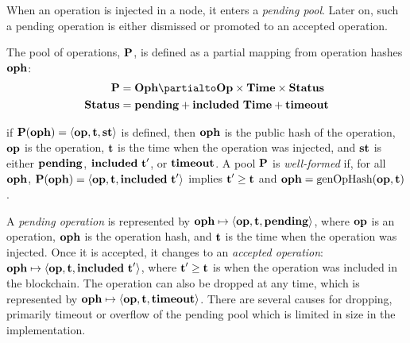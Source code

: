\documentclass[a4paper]{llncs}
\begin{document}
When an operation is injected in a node, it enters a \emph{pending
  pool}. Later on, such a pending operation is either dismissed or
promoted to an accepted operation.

\begin{definition}
  The pool of operations, $\textbf{P}$, is defined as a partial mapping from
  operation hashes $\textbf{oph}$: 
  \begin{align*}
    \PENDING &= \TOPH \partialto \TOP\times \TTIME \times \TSTATUS \\
    \TSTATUS&= \STATUSPENDING + \STATUSINCLUDED\ \TTIME + \STATUSTIMEOUT
  \end{align*}
  
  if $\textbf{P}(\textbf{oph}) = \langle  \textbf{op}, \textbf{t}, \textbf{st}
\rangle $ is defined, then $\textbf{oph}$ is the public hash of the operation, $\textbf{op}$ is the operation, $\textbf{t}$ is the time when the
operation was injected, and $\textbf{st}$ is either $\textbf{pending}$,
$\textbf{included}\ \textbf{t}'$, or $\textbf{timeout}$.
A pool $\textbf{P}$ is \emph{well-formed} if, for all $\textbf{oph}$, $\textbf{P} (\textbf{oph}) =
  \langle\textbf{op},\textbf{t}, \textbf{included}\ \textbf{t}'\rangle$ implies $\textbf{t}' \ge
  \textbf{t}$ and $\textbf{oph} = \textup{genOpHash} (\textbf{op}, \textbf{t})$.
\end{definition}


A \emph{pending operation} is represented by
$\textbf{oph} \mapsto \langle  \textbf{op}, \textbf{t}, \textbf{pending}\rangle $,
where $\textbf{op}$ is an operation, $\textbf{oph}$ is the operation hash,
and $\textbf{t}$ is the time when the operation was injected.
Once it is accepted, it changes to an \emph{accepted operation}:
$\textbf{oph} \mapsto \langle  \textbf{op}, \textbf{t}, \textbf{included}\ \textbf{t}'\rangle $, where
$\textbf{t}' \ge \textbf{t}$ is  when the operation was included in the
blockchain.  The operation can also be dropped at any time, which is
represented by
$\textbf{oph} \mapsto \langle  \textbf{op}, \textbf{t}, \textbf{timeout}\rangle $. There are several
causes for dropping, primarily timeout or overflow of the pending
pool which is limited in size in the implementation.



\end{document}
